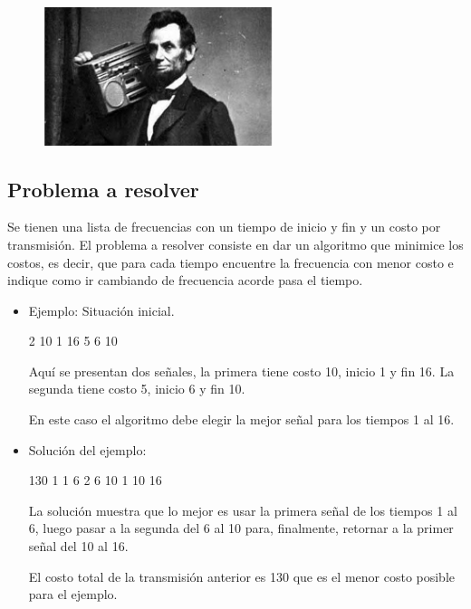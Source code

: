 \begin{figure}[h]
\begin{center}
\includegraphics[width=0.6\textwidth] {imagenes/frecuencia.jpeg}
\end{center}
\end{figure}

\subsection{Problema a resolver}
Se tienen una lista de frecuencias con un tiempo de inicio y fin y un costo por transmisión. El problema a resolver consiste en dar un algoritmo que minimice los costos, es decir, que para cada tiempo encuentre la frecuencia con menor costo e indique como ir cambiando de frecuencia acorde pasa el tiempo.

\begin{itemize}
\item Ejemplo: Situación inicial.

\begin{codesnippet}
2
10 1 16
5 6 10
\end{codesnippet}

Aquí se presentan dos señales, la primera tiene costo 10, inicio 1 y fin 16. La segunda tiene costo 5, inicio 6 y fin 10.

En este caso el algoritmo debe elegir la mejor señal para los tiempos 1 al 16.
\item Solución del ejemplo:

\begin{codesnippet}
130
1 1 6
2 6 10
1 10 16
\end{codesnippet}

La solución muestra que lo mejor es usar la primera señal de los tiempos 1 al 6, luego pasar a la segunda del 6 al 10 para, finalmente, retornar a la primer señal del 10 al 16.

El costo total de la transmisión anterior es 130 que es el menor costo posible para el ejemplo.

\end{itemize}

